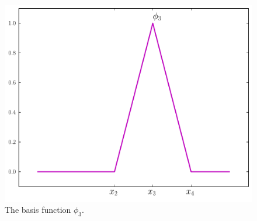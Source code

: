 





\begin{figure}[ht]
\centering
\includegraphics[width=\textwidth]{one_basis_function.pdf}
\caption{The basis function $\phi_3$.}
\label{FEM:one_basis_function}
\end{figure}


